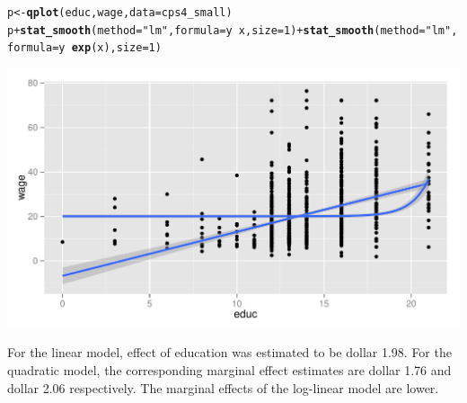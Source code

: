 \documentclass[a4paper]{article}\usepackage{graphicx, color}
\makeatletter
\def\maxwidth{ %
  \ifdim\Gin@nat@width>\linewidth
    \linewidth
  \else
    \Gin@nat@width
  \fi
}
\newcommand{\hlfunctioncall}[1]{\textcolor[rgb]{0.501960784313725,0,0.329411764705882}{\textbf{#1}}}%
\newcommand{\hlstring}[1]{\textcolor[rgb]{0.6,0.6,1}{#1}}%
\newenvironment{kframe}{%
 \def\at@end@of@kframe{}%
 \ifinner\ifhmode%
  \def\at@end@of@kframe{\end{minipage}}%
  \begin{minipage}{\columnwidth}%
 \fi\fi%
 \def\FrameCommand##1{\hskip\@totalleftmargin \hskip-\fboxsep
 \colorbox{shadecolor}{##1}\hskip-\fboxsep
     \hskip-\linewidth \hskip-\@totalleftmargin \hskip\columnwidth}%
 \MakeFramed {\advance\hsize-\width
   \@totalleftmargin\z@ \linewidth\hsize
   \@setminipage}}%
 {\par\unskip\endMakeFramed%
 \at@end@of@kframe}
\newenvironment{knitrout}{}{} %
\makeatother
\begin{document}
\begin{knitrout}
\color{fgcolor}\begin{kframe}
\begin{alltt}
p <- \hlfunctioncall{qplot}(educ, wage, data = cps4_small)
p + \hlfunctioncall{stat_smooth}(method = \hlstring{"lm"}, formula = y ~ x, size = 1) + \hlfunctioncall{stat_smooth}(method = \hlstring{"lm"}, 
    formula = y ~ \hlfunctioncall{exp}(x), size = 1)
\end{alltt}
\end{kframe}
\includegraphics[width=\maxwidth]{figure/unnamed-chunk-10} 

\end{knitrout}


For the linear model, effect of education was estimated to be dollar 1.98. For the quadratic model, the corresponding marginal effect estimates are dollar 1.76 and dollar 2.06 respectively. The marginal effects of the log-linear model are lower.\\
\end{document}
